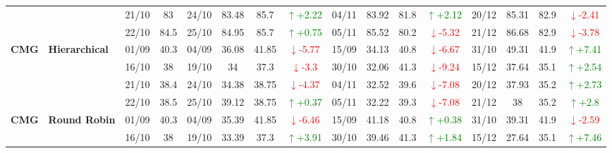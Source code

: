 \documentclass{ieeeaccess}
\begin{document}
{\begin{longtable}{llcc|cccc|cccc|cccc}
&
& 21/10 & 83 & 24/10 & 83.48 & 85.7 & \textcolor{green}{\(\uparrow\)+2.22} & 04/11 & 83.92 & 81.8 & \textcolor{green}{\(\uparrow\)+2.12} & 20/12 & 85.31 & 82.9 & \textcolor{red}{\(\downarrow\)-2.41} \\

&
& 22/10 & 84.5 & 25/10 & 84.95 & 85.7 & \textcolor{green}{\(\uparrow\)+0.75} & 05/11 & 85.52 & 80.2 & \textcolor{red}{\(\downarrow\)-5.32} & 21/12 & 86.68 & 82.9 & \textcolor{red}{\(\downarrow\)-3.78} \\




\midrule


\multirow{4}{*}{\textbf{CMG}} 
& \textbf{Hierarchical}
& 01/09 & 40.3 & 04/09 & 36.08 & 41.85 & \textcolor{red}{\(\downarrow\)-5.77} & 15/09 & 34.13 & 40.8 & \textcolor{red}{\(\downarrow\)-6.67} & 31/10 & 49.31 & 41.9 & \textcolor{green}{\(\uparrow\)+7.41} \\

& 
& 16/10 & 38 & 19/10 & 34 & 37.3 & \textcolor{red}{\(\downarrow\)-3.3} & 30/10 & 32.06 & 41.3 & \textcolor{red}{\(\downarrow\)-9.24} & 15/12 & 37.64 & 35.1 & \textcolor{green}{\(\uparrow\)+2.54} \\

& 
& 21/10 & 38.4 & 24/10 & 34.38 & 38.75 & \textcolor{red}{\(\downarrow\)-4.37} & 04/11 & 32.52 & 39.6 & \textcolor{red}{\(\downarrow\)-7.08} & 20/12 & 37.93 & 35.2 & \textcolor{green}{\(\uparrow\)+2.73} \\

&
& 22/10 & 38.5 & 25/10 & 39.12 & 38.75 & \textcolor{green}{\(\uparrow\)+0.37} & 05/11 & 32.22 & 39.3 & \textcolor{red}{\(\downarrow\)-7.08} & 21/12 & 38 & 35.2 & \textcolor{green}{\(\uparrow\)+2.8} \\
\midrule


\multirow{4}{*}{\textbf{CMG}} 
& \textbf{Round Robin}
& 01/09 & 40.3 & 04/09 & 35.39 & 41.85 & \textcolor{red}{\(\downarrow\)-6.46} & 15/09 & 41.18 & 40.8 & \textcolor{green}{\(\uparrow\)+0.38} & 31/10 & 39.31 & 41.9 & \textcolor{red}{\(\downarrow\)-2.59} \\

& 
& 16/10 & 38 & 19/10 & 33.39 & 37.3 & \textcolor{green}{\(\uparrow\)+3.91} & 30/10 & 39.46 & 41.3 & \textcolor{green}{\(\uparrow\)+1.84} & 15/12 & 27.64 & 35.1 & \textcolor{green}{\(\uparrow\)+7.46} \\


\end{longtable}}
\end{document}
